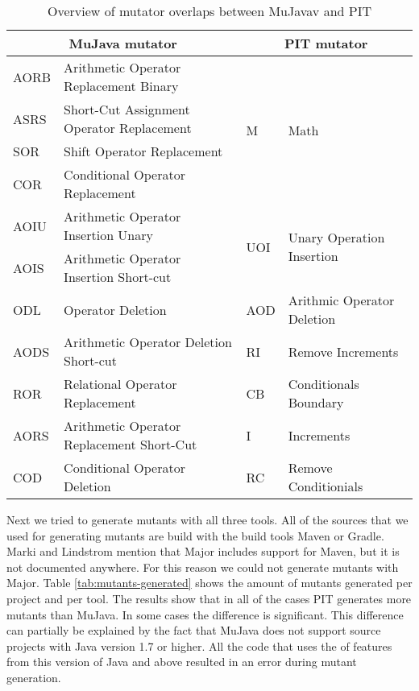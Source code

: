 \documentclass[../main]{subfiles}
\begin{document}
\begin{table}[htb]
\centering
\begin{tabular}{|l|l|l|l|}
\hline
\multicolumn{2}{|c|}{\textbf{ MuJava mutator}}      & \multicolumn{2}{c|}{\textbf{PIT mutator}}                         \\ \hline
AORB & Arithmetic Operator Replacement Binary      & \multirow{4}{*}{M}   & \multirow{4}{*}{Math}                      \\ \cline{1-2}
ASRS & Short-Cut Assignment   Operator Replacement &                      &                                            \\ \cline{1-2}
SOR  & Shift Operator   Replacement                &                      &                                            \\ \cline{1-2}
COR  & Conditional Operator   Replacement          &                      &                                            \\ \hline
AOIU & Arithmetic Operator   Insertion Unary       & \multirow{2}{*}{UOI} & \multirow{2}{*}{Unary Operation Insertion} \\ \cline{1-2}
AOIS & Arithmetic Operator   Insertion Short-cut   &                      &                                            \\ \hline
ODL  & Operator Deletion                           & AOD                  & Arithmic Operator   Deletion               \\ \hline
AODS & Arithmetic Operator   Deletion Short-cut    & RI                   & Remove Increments                          \\ \hline
ROR  & Relational Operator   Replacement           & CB                   & Conditionals Boundary                      \\ \hline
AORS & Arithmetic Operator   Replacement Short-Cut & I                    & Increments                                 \\ \hline
COD  & Conditional Operator   Deletion             & RC                   & Remove Conditionials                       \\ \hline

\end{tabular}
\caption{\label{tab:mutators-overlap}Overview of mutator overlaps between  MuJavav and PIT}
\end{table}
Next we tried to generate mutants with all three tools. 
All of the sources that we used for generating mutants are build with the build tools Maven or Gradle. 
Marki and Lindstrom\cite{Marki2017MutationJava} mention that Major includes support for Maven, but it is not documented anywhere.
For this reason we could not generate mutants with Major.
Table \ref{tab:mutants-generated} shows the amount of mutants generated per project and per tool. The results show that in all of the cases PIT generates more mutants than MuJava. In some cases the difference is significant. This difference can partially be explained by the fact that MuJava does not support source projects with Java version 1.7 or higher\cite{mujava}. All the code that uses the of features from this version of Java and above resulted in an error during mutant generation.
\end{document}
